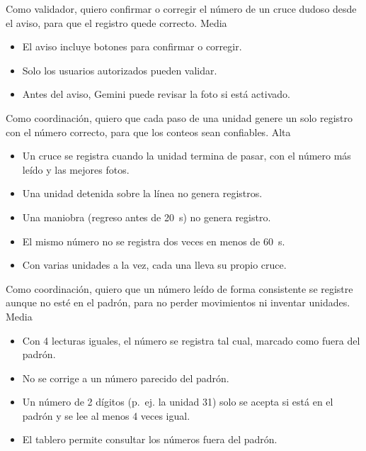   {Como validador, quiero confirmar o corregir el número de un cruce
   dudoso desde el aviso, para que el registro quede correcto.}
  {Media}
  {\begin{itemize}[nosep,leftmargin=*]
     \item El aviso incluye botones para confirmar o corregir.
     \item Solo los usuarios autorizados pueden validar.
     \item Antes del aviso, Gemini puede revisar la foto si está activado.
   \end{itemize}}

  {Como coordinación, quiero que cada paso de una unidad genere un solo
   registro con el número correcto, para que los conteos sean confiables.}
  {Alta}
  {\begin{itemize}[nosep,leftmargin=*]
     \item Un cruce se registra cuando la unidad termina de pasar, con el
           número más leído y las mejores fotos.
     \item Una unidad detenida sobre la línea no genera registros.
     \item Una maniobra (regreso antes de 20~s) no genera registro.
     \item El mismo número no se registra dos veces en menos de 60~s.
     \item Con varias unidades a la vez, cada una lleva su propio cruce.
   \end{itemize}}

  {Como coordinación, quiero que un número leído de forma consistente se
   registre aunque no esté en el padrón, para no perder movimientos ni
   inventar unidades.}
  {Media}
  {\begin{itemize}[nosep,leftmargin=*]
     \item Con 4 lecturas iguales, el número se registra tal cual, marcado
           como fuera del padrón.
     \item No se corrige a un número parecido del padrón.
     \item Un número de 2 dígitos (p.~ej. la unidad 31) solo se acepta si
           está en el padrón y se lee al menos 4 veces igual.
     \item El tablero permite consultar los números fuera del padrón.
   \end{itemize}}

